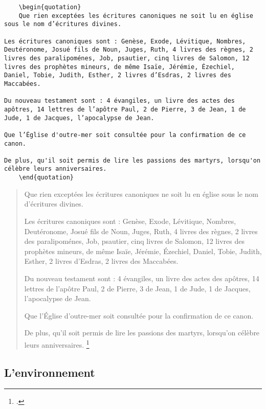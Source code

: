 \begin{verbatim}
	\begin{quotation}
	Que rien exceptées les écritures canoniques ne soit lu en église sous le nom d’écritures divines.

Les écritures canoniques sont : Genèse, Exode, Lévitique, Nombres, Deutéronome, Josué fils de Noun, Juges, Ruth, 4 livres des règnes, 2 livres des paralipoménes, Job, psautier, cinq livres de Salomon, 12 livres des prophètes mineurs, de même Isaïe, Jérémie, Ézechiel, Daniel, Tobie, Judith, Esther, 2 livres d’Esdras, 2 livres des Maccabées.

Du nouveau testament sont : 4 évangiles, un livre des actes des apôtres, 14 lettres de l’apôtre Paul, 2 de Pierre, 3 de Jean, 1 de Jude, 1 de Jacques, l’apocalypse de Jean.

Que l’Église d'outre-mer soit consultée pour la confirmation de ce canon.

De plus, qu'il soit permis de lire les passions des martyrs, lorsqu'on célèbre leurs anniversaires.
	\end{quotation}
\end{verbatim}

	\begin{quotation}
Que rien exceptées les écritures canoniques ne soit lu en église sous le nom d’écritures divines.

Les écritures canoniques sont : Genèse, Exode, Lévitique, Nombres, Deutéronome, Josué fils de Noun, Juges, Ruth, 4 livres des règnes, 2 livres des paralipoménes, Job, psautier, cinq livres de Salomon, 12 livres des prophètes mineurs, de même Isaïe, Jérémie, Ézechiel, Daniel, Tobie, Judith, Esther, 2 livres d’Esdras, 2 livres des Maccabées.

Du nouveau testament sont : 4 évangiles, un livre des actes des apôtres, 14 lettres de l’apôtre Paul, 2 de Pierre, 3 de Jean, 1 de Jude, 1 de Jacques, l’apocalypse de Jean.

Que l’Église d'outre-mer soit consultée pour la confirmation de ce canon.

De plus, qu'il soit permis de lire les passions des martyrs, lorsqu'on célèbre leurs anniversaires.
\footcite{BreveHippone}
	\end{quotation}

\subsection{L'environnement }

